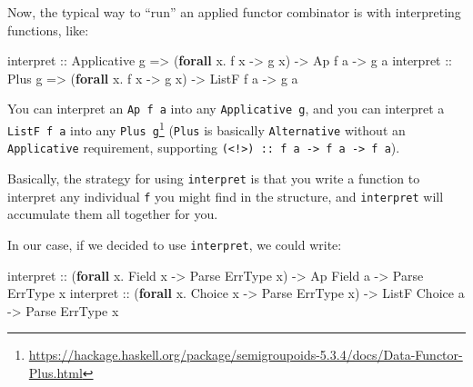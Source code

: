 \documentclass[]{article}
\newenvironment{Shaded}{}{}
\newcommand{\DataTypeTok}[1]{\textcolor[rgb]{0.56,0.13,0.00}{#1}}
\newcommand{\KeywordTok}[1]{\textcolor[rgb]{0.00,0.44,0.13}{\textbf{#1}}}
\newcommand{\NormalTok}[1]{#1}
\newcommand{\OperatorTok}[1]{\textcolor[rgb]{0.40,0.40,0.40}{#1}}
\newcommand{\OtherTok}[1]{\textcolor[rgb]{0.00,0.44,0.13}{#1}}
\renewcommand{\href}[2]{#2\footnote{\url{#1}}}
\begin{document}
Now, the typical way to ``run'' an applied functor combinator is with
interpreting functions, like:

\begin{Shaded}
\begin{Highlighting}[]
\OtherTok{interpret ::} \DataTypeTok{Applicative}\NormalTok{ g }\OtherTok{=\textgreater{}}\NormalTok{ (}\KeywordTok{forall}\NormalTok{ x}\OperatorTok{.}\NormalTok{ f x }\OtherTok{{-}\textgreater{}}\NormalTok{ g x) }\OtherTok{{-}\textgreater{}} \DataTypeTok{Ap}\NormalTok{    f a }\OtherTok{{-}\textgreater{}}\NormalTok{ g a}
\OtherTok{interpret ::} \DataTypeTok{Plus}\NormalTok{ g        }\OtherTok{=\textgreater{}}\NormalTok{ (}\KeywordTok{forall}\NormalTok{ x}\OperatorTok{.}\NormalTok{ f x }\OtherTok{{-}\textgreater{}}\NormalTok{ g x) }\OtherTok{{-}\textgreater{}} \DataTypeTok{ListF}\NormalTok{ f a }\OtherTok{{-}\textgreater{}}\NormalTok{ g a}
\end{Highlighting}
\end{Shaded}

You can interpret an \texttt{Ap\ f\ a} into any \texttt{Applicative\ g}, and you
can interpret a \texttt{ListF\ f\ a} into any
\href{https://hackage.haskell.org/package/semigroupoids-5.3.4/docs/Data-Functor-Plus.html}{\texttt{Plus\ g}}
(\texttt{Plus} is basically \texttt{Alternative} without an \texttt{Applicative}
requirement, supporting
\texttt{(\textless{}!\textgreater{})\ ::\ f\ a\ -\textgreater{}\ f\ a\ -\textgreater{}\ f\ a}).

Basically, the strategy for using \texttt{interpret} is that you write a
function to interpret any individual \texttt{f} you might find in the structure,
and \texttt{interpret} will accumulate them all together for you.

In our case, if we decided to use \texttt{interpret}, we could write:

\begin{Shaded}
\begin{Highlighting}[]
\OtherTok{interpret ::}\NormalTok{ (}\KeywordTok{forall}\NormalTok{ x}\OperatorTok{.} \DataTypeTok{Field}\NormalTok{  x }\OtherTok{{-}\textgreater{}} \DataTypeTok{Parse} \DataTypeTok{ErrType}\NormalTok{ x) }\OtherTok{{-}\textgreater{}} \DataTypeTok{Ap}    \DataTypeTok{Field}\NormalTok{  a }\OtherTok{{-}\textgreater{}} \DataTypeTok{Parse} \DataTypeTok{ErrType}\NormalTok{ x}
\OtherTok{interpret ::}\NormalTok{ (}\KeywordTok{forall}\NormalTok{ x}\OperatorTok{.} \DataTypeTok{Choice}\NormalTok{ x }\OtherTok{{-}\textgreater{}} \DataTypeTok{Parse} \DataTypeTok{ErrType}\NormalTok{ x) }\OtherTok{{-}\textgreater{}} \DataTypeTok{ListF} \DataTypeTok{Choice}\NormalTok{ a }\OtherTok{{-}\textgreater{}} \DataTypeTok{Parse} \DataTypeTok{ErrType}\NormalTok{ x}
\end{Highlighting}
\end{Shaded}
\end{document}
